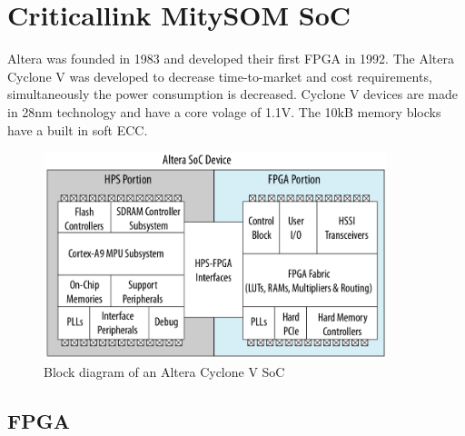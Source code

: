 \chapter{Criticallink MitySOM SoC}
Altera was founded in 1983 and developed their first FPGA in 1992.\cite{althist16} The Altera Cyclone V was developed to decrease time-to-market and cost requirements, simultaneously the power consumption is decreased. Cyclone V devices are made in 28nm technology and have a core volage of 1.1V. The 10kB memory blocks have a built in soft ECC. \cite{altcycvov15}
\begin{figure}[htbp]
\begin{center}
\includegraphics[width=10cm,keepaspectratio=true]{bilder/png/AlteraSoC}
\caption{Block diagram of an Altera Cyclone V SoC\cite[chapter 1]{AlteraHPS15}}
\label{fig:alterasocblocks}
\end{center}
\end{figure}
\section{FPGA}
